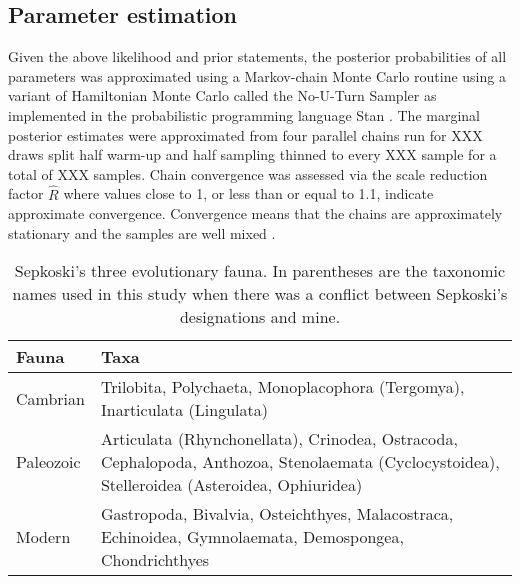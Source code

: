 \documentclass[12pt,letterpaper]{article}
\begin{document}
\subsection{Parameter estimation}
Given the above likelihood and prior statements, the posterior probabilities of all parameters was approximated using a Markov-chain Monte Carlo routine using a variant of Hamiltonian Monte Carlo called the No-U-Turn Sampler \citep{Hoffman2014} as implemented in the probabilistic programming language Stan \citep{stan-software:2014}. The marginal posterior estimates were approximated from four parallel chains run for XXX draws split half warm-up and half sampling thinned to every XXX sample for a total of XXX samples. Chain convergence was assessed via the scale reduction factor \(\hat{R}\) where values close to 1, or less than or equal to 1.1, indicate approximate convergence. Convergence means that the chains are approximately stationary and the samples are well mixed \citep{Gelman2013d}.




\begin{table}
  \centering
  \begin{tabular}{l | p{}}
    \hline
    Fauna & Taxa \\
    \hline
    \hline
    Cambrian & Trilobita, Polychaeta, Monoplacophora (Tergomya), Inarticulata (Lingulata)\\[0.1cm]
    Paleozoic & Articulata (Rhynchonellata), Crinodea, Ostracoda, Cephalopoda, Anthozoa, Stenolaemata (Cyclocystoidea), Stelleroidea (Asteroidea, Ophiuridea) \\[0.1cm]
    Modern & Gastropoda, Bivalvia, Osteichthyes, Malacostraca, Echinoidea, Gymnolaemata, Demospongea, Chondrichthyes \\
    \hline
  \end{tabular}
  \caption{Sepkoski's three evolutionary fauna. In parentheses are the taxonomic names used in this study when there was a conflict between Sepkoski's designations and mine.}
  \label{tab:sepkoski}
\end{table}
\end{document}
